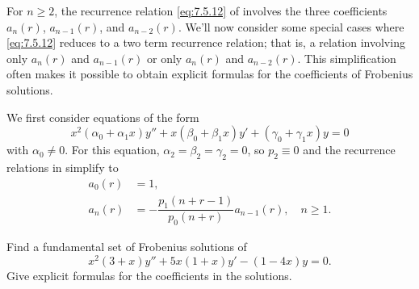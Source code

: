 
For $n\ge2$, the recurrence relation \eqref{eq:7.5.12} of
 involves the three coefficients
$a_n(r)$, $a_{n-1}(r)$, and $a_{n-2}(r)$. We'll now consider some
special cases where \eqref{eq:7.5.12} reduces to a two term recurrence
relation; that is, a relation involving only $a_n(r)$ and $a_{n-1}(r)$
or only $a_n(r)$ and $a_{n-2}(r)$. This simplification often makes it
possible to obtain explicit formulas for the coefficients of Frobenius
solutions.

We first consider equations of the form
\[
x^2(\alpha_0+\alpha_1x)y''+x(\beta_0+\beta_1x)y'+(\gamma_0+\gamma_1x)y=0
\]
with $\alpha_0\ne0$. For this equation,
$\alpha_2=\beta_2=\gamma_2=0$, so $p_2\equiv0$ and the recurrence
relations in  simplify to
\begin{equation} \label{eq:7.5.20}
\begin{aligned}
a_0(r)&=1,\\
a_n(r)&=-\dfrac{p_1(n+r-1)}{p_0(n+r)}a_{n-1}(r),\quad n\ge1.
\end{aligned}
\end{equation}

\begin{example}\label{example:7.5.2}
Find a fundamental set of Frobenius  solutions of
\begin{equation} \label{eq:7.5.21}
x^2(3+x)y''+5x(1+x)y'-(1-4x)y=0.
\end{equation}
Give explicit  formulas for the coefficients in the solutions.
\end{example}

